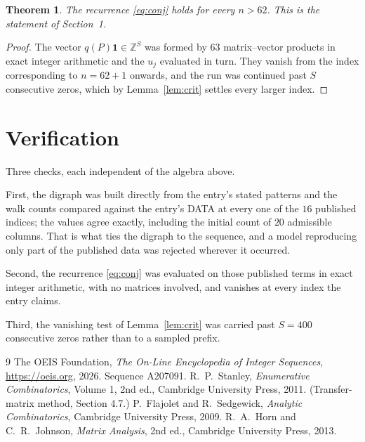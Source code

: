 \documentclass[11pt,a4paper]{article}
\theoremstyle{plain}
\newtheorem{theorem}{Theorem}
\theoremstyle{definition}
\begin{document}
\begin{theorem}
The recurrence \eqref{eq:conj} holds for every $n>62$. This is the statement of
Section~1.
\end{theorem}

\begin{proof}
The vector $q(P)\mathbf{1}\in\mathbb{Z}^{S}$ was formed by $63$ matrix--vector
products in exact integer arithmetic and the $u_j$ evaluated in turn. They vanish from the
index corresponding to $n=62+1$ onwards, and the run was continued past $S$ consecutive
zeros, which by Lemma~\ref{lem:crit} settles every larger index.
\end{proof}

\section{Verification}

Three checks, each independent of the algebra above.

First, the digraph was built directly from the entry's stated patterns and the walk counts
compared against the entry's DATA at every one of the $16$ published indices; the
values agree exactly, including the initial count of $20$ admissible columns. That is
what ties the digraph to the sequence, and a model reproducing only part of the published
data was rejected wherever it occurred.

Second, the recurrence \eqref{eq:conj} was evaluated on those published terms in exact
integer arithmetic, with no matrices involved, and vanishes at every index the entry claims.

Third, the vanishing test of Lemma~\ref{lem:crit} was carried past $S=400$ consecutive
zeros rather than to a sampled prefix.

\begin{thebibliography}{9}
 The OEIS Foundation, \emph{The On-Line Encyclopedia of Integer
Sequences}, \url{https://oeis.org}, 2026. Sequence A207091.
 R.~P.~Stanley, \emph{Enumerative Combinatorics}, Volume 1, 2nd ed.,
Cambridge University Press, 2011. (Transfer-matrix method, Section 4.7.)
 P.~Flajolet and R.~Sedgewick, \emph{Analytic Combinatorics}, Cambridge
University Press, 2009.
 R.~A.~Horn and C.~R.~Johnson, \emph{Matrix Analysis}, 2nd ed., Cambridge
University Press, 2013.
\end{thebibliography}
\end{document}
